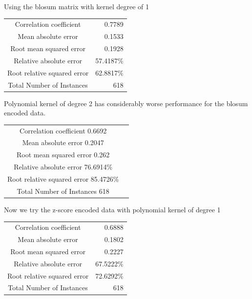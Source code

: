 Using the blosum matrix with kernel degree of 1

\begin{table}[ht]
\begin{center}
\begin{tabular}{ c r }
Correlation coefficient  &                0.7789 \\
Mean absolute error       &               0.1533 \\
Root mean squared error   &               0.1928 \\
Relative absolute error   &              57.4187\% \\
Root relative squared error  &           62.8817\% \\
Total Number of Instances     &         618  \\
\end{tabular}
\end{center}
\end{table}

Polynomial kernel of degree 2 has considerably worse performance for the blosum encoded data.

\begin{table}[ht]
\begin{center}
\begin{tabular}{ c r }	
Correlation coefficient                  0.6692 \\
Mean absolute error                      0.2047 \\
Root mean squared error                  0.262 \\
Relative absolute error                 76.6914\% \\
Root relative squared error             85.4726\% \\
Total Number of Instances              618  \\
\end{tabular}
\end{center}
\end{table}

Now we try the z-score encoded data with polynomial kernel of degree 1

\begin{table}[ht]
\begin{center}
\begin{tabular}{ c r }
Correlation coefficient   &              0.6888 \\
Mean absolute error        &              0.1802 \\
Root mean squared error    &              0.2227 \\
Relative absolute error    &             67.5222\% \\
Root relative squared error &             72.6292\% \\
Total Number of Instances   &           618     \\
\end{tabular}
\end{center}
\end{table}


